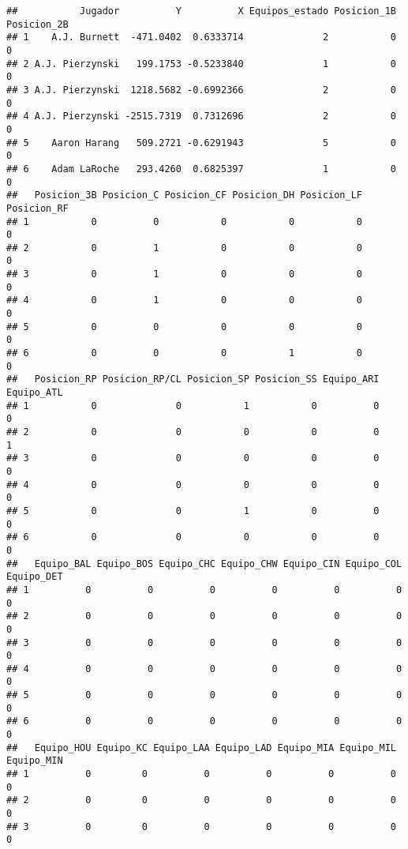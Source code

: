 \documentclass[
]{article}
\begin{document}
\begin{verbatim}
##           Jugador          Y          X Equipos_estado Posicion_1B Posicion_2B
## 1    A.J. Burnett  -471.0402  0.6333714              2           0           0
## 2 A.J. Pierzynski   199.1753 -0.5233840              1           0           0
## 3 A.J. Pierzynski  1218.5682 -0.6992366              2           0           0
## 4 A.J. Pierzynski -2515.7319  0.7312696              2           0           0
## 5    Aaron Harang   509.2721 -0.6291943              5           0           0
## 6    Adam LaRoche   293.4260  0.6825397              1           0           0
##   Posicion_3B Posicion_C Posicion_CF Posicion_DH Posicion_LF Posicion_RF
## 1           0          0           0           0           0           0
## 2           0          1           0           0           0           0
## 3           0          1           0           0           0           0
## 4           0          1           0           0           0           0
## 5           0          0           0           0           0           0
## 6           0          0           0           1           0           0
##   Posicion_RP Posicion_RP/CL Posicion_SP Posicion_SS Equipo_ARI Equipo_ATL
## 1           0              0           1           0          0          0
## 2           0              0           0           0          0          1
## 3           0              0           0           0          0          0
## 4           0              0           0           0          0          0
## 5           0              0           1           0          0          0
## 6           0              0           0           0          0          0
##   Equipo_BAL Equipo_BOS Equipo_CHC Equipo_CHW Equipo_CIN Equipo_COL Equipo_DET
## 1          0          0          0          0          0          0          0
## 2          0          0          0          0          0          0          0
## 3          0          0          0          0          0          0          0
## 4          0          0          0          0          0          0          0
## 5          0          0          0          0          0          0          0
## 6          0          0          0          0          0          0          0
##   Equipo_HOU Equipo_KC Equipo_LAA Equipo_LAD Equipo_MIA Equipo_MIL Equipo_MIN
## 1          0         0          0          0          0          0          0
## 2          0         0          0          0          0          0          0
## 3          0         0          0          0          0          0          0

\end{verbatim}
\end{document}

